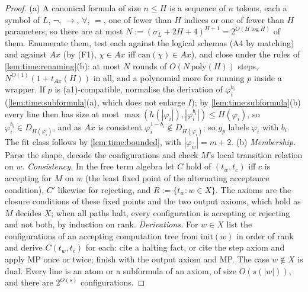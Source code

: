 \begin{proof}
(a) A canonical formula of size $n\le H$ is a sequence of $n$ tokens, each a symbol of $L$, $\neg$, $\to$, $\forall$, $=$, one of fewer than $H$ indices or one of fewer than $H$ parameters; so there are at most $N:=(\sigma_L+2H+4)^{H+1}=2^{O(H\log H)}$ of them. Enumerate them, test each against the logical schemas (A4 by matching) and against $Ax$ (by (F1), $\chi\in Ax$ iff $\mathrm{can}(\chi)\in Ax$), and close under the rules of \cref{lem:time:renaming}(b): at most $N$ rounds of $O(N\,\mathrm{poly}(H))$ steps, $N^{O(1)}(1+t_{Ax}(H))$ in all, and a polynomial more for running $p$ inside a wrapper. If $p$ is (a1)-compatible, normalise the derivation of $\varphi_i^{b_i}$ (\cref{lem:time:subformula}(a), which does not enlarge $I$); by \cref{lem:time:subformula}(b) every line then has size at most $\max(h(|\varphi_i|),|\varphi_i^{b_i}|)\le H(\varphi_i)$, so $\varphi_i^{b_i}\in D_{H(\varphi_i)}$, and as $Ax$ is consistent $\varphi_i^{1-b_i}\notin D_{H(\varphi_i)}$; so $g_p$ labels $\varphi_i$ with $b_i$. The fit class follows by \cref{lem:time:bounded}, with $|\varphi_w|=m+2$.
(b) \emph{Membership.} Parse the shape, decode the configurations and check $M$'s local transition relation on $w$. \emph{Consistency.} In the free term algebra let $C$ hold of $(t_w,t_c)$ iff $c$ is accepting for $M$ on $w$ (the least fixed point of the alternating acceptance condition), $C'$ likewise for rejecting, and $R:=\{t_w:w\in X\}$. The axioms are the closure conditions of these fixed points and the two output axioms, which hold as $M$ decides $X$; when all paths halt, every configuration is accepting or rejecting and not both, by induction on rank. \emph{Derivations.} For $w\in X$ list the configurations of an accepting computation tree from $\mathrm{init}(w)$ in order of rank and derive $C(t_w,t_c)$ for each: cite a halting fact, or cite the step axiom and apply MP once or twice; finish with the output axiom and MP. The case $w\notin X$ is dual. Every line is an atom or a subformula of an axiom, of size $O(s(|w|))$, and there are $2^{O(s)}$ configurations.
\end{proof}

